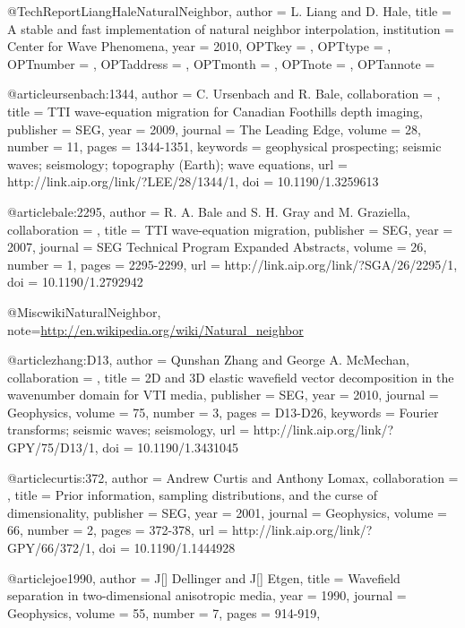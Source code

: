 @TechReport{LiangHaleNaturalNeighbor,
  author = 	 {L. Liang and D. Hale},
  title = 	 {A stable and fast implementation of natural neighbor
                  interpolation},
  institution =  {Center for Wave Phenomena},
  year = 	 {2010},
  OPTkey = 	 {},
  OPTtype = 	 {},
  OPTnumber = 	 {},
  OPTaddress = 	 {},
  OPTmonth = 	 {},
  OPTnote = 	 {},
  OPTannote = 	 {}
}


@article{ursenbach:1344,
author = {C. Ursenbach and R. Bale},
collaboration = {},
title = {TTI wave-equation migration for Canadian Foothills depth imaging},
publisher = {SEG},
year = {2009},
journal = {The Leading Edge},
volume = {28},
number = {11},
pages = {1344-1351},
keywords = {geophysical prospecting; seismic waves; seismology; topography (Earth); wave equations},
url = {http://link.aip.org/link/?LEE/28/1344/1},
doi = {10.1190/1.3259613}
}







@article{bale:2295,
author = {R. A. Bale and S. H. Gray and M. Graziella},
collaboration = {},
title = {TTI wave-equation migration},
publisher = {SEG},
year = {2007},
journal = {SEG Technical Program Expanded Abstracts},
volume = {26},
number = {1},
pages = {2295-2299},
url = {http://link.aip.org/link/?SGA/26/2295/1},
doi = {10.1190/1.2792942}
}


@Misc{wikiNaturalNeighbor,
  note={\url{http://en.wikipedia.org/wiki/Natural_neighbor}  }
}



@article{zhang:D13,
author = {Qunshan Zhang and George A. McMechan},
collaboration = {},
title = {2{D} and 3{D} elastic wavefield vector decomposition in the wavenumber domain for VTI media},
publisher = {SEG},
year = {2010},
journal = {Geophysics},
volume = {75},
number = {3},
pages = {D13-D26},
keywords = {{F}ourier transforms; seismic waves; seismology},
url = {http://link.aip.org/link/?GPY/75/D13/1},
doi = {10.1190/1.3431045}
}



@article{curtis:372,
author = {Andrew Curtis and Anthony Lomax},
collaboration = {},
title = {Prior information, sampling distributions, and the curse of dimensionality},
publisher = {SEG},
year = {2001},
journal = {Geophysics},
volume = {66},
number = {2},
pages = {372-378},
url = {http://link.aip.org/link/?GPY/66/372/1},
doi = {10.1190/1.1444928}
}

@article{joe1990,
author = {J[] Dellinger and J[] Etgen},
title = {Wavefield separation in two-dimensional anisotropic media},
year = {1990},
journal = {Geophysics},
volume = {55},
number = {7},
pages = {914-919},
}

